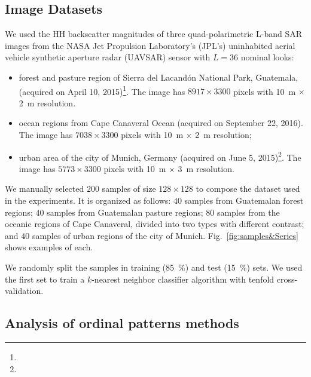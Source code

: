 \documentclass[journal]{IEEEtran}
\begin{document}
\subsection{Image Datasets}

We used the HH backscatter magnitudes of three quad-polarimetric L-band SAR images from the NASA Jet Propulsion Laboratory’s (JPL’s) uninhabited aerial vehicle synthetic aperture radar (UAVSAR) sensor with $L=36$ nominal looks:
\begin{itemize}
	\item forest and pasture region of Sierra del Lacandón National Park, Guatemala, (acquired on April 10, 2015)\footnote{}. 
	The image has $8917 \times 3300$ pixels with 
	\SI[inter-unit-product =$\cdot$]{10}{\meter} $\times$ \SI[inter-unit-product =$\cdot$]{2}{\meter} resolution.
	\item ocean regions from Cape Canaveral Ocean (acquired on September 22, 2016).
	The image has $7038 \times 3300$ pixels with 
	\SI[inter-unit-product =$\cdot$]{10}{\meter} $\times$ \SI[inter-unit-product =$\cdot$]{2}{\meter} resolution;
	\item urban area of the city of Munich, Germany (acquired on June 5, 2015)\footnote{}.
	The image has $5773 \times 3300$ pixels with 
	\SI[inter-unit-product =$\cdot$]{10}{\meter} $\times$ \SI[inter-unit-product =$\cdot$]{3}{\meter} resolution.
\end{itemize}

We manually selected $200$ samples of size $128 \times 128$ to compose the dataset used in the experiments.
It is organized as follows:
$40$ samples from Guatemalan forest regions;
$40$ samples from Guatemalan pasture regions;
$80$ samples from the oceanic regions of Cape Canaveral, divided into two types with different contrast; and
$40$ samples of urban regions of the city of Munich.
Fig.~\ref{fig:samples&Series} shows examples of each.

We randomly split the samples in training (\SI{85}{\percent}) and test (\SI{15}{\percent}) sets.
We used the first set to train a $k$-nearest neighbor classifier algorithm with tenfold cross-validation.

\subsection{Analysis of ordinal patterns methods}
\end{document}
